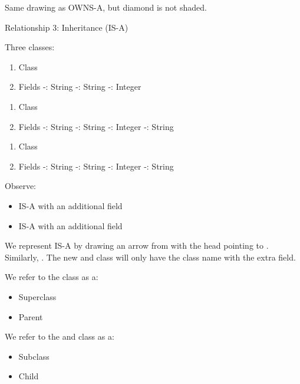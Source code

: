 Same drawing as OWNS-A, but diamond is not shaded.

Relationship 3: Inheritance (IS-A)

Three classes:
\begin{enumerate}[(1)]
    \item Class
          \subitem {}
    \item Fields
          \subitem -: String
          \subitem -: String
          \subitem -: Integer
\end{enumerate}

\begin{enumerate}[(1)]
    \item Class
          \subitem {}
    \item Fields
          \subitem -: String
          \subitem -: String
          \subitem -: Integer
          \subitem -: String
\end{enumerate}

\begin{enumerate}[(1)]
    \item Class
          \subitem {}
    \item Fields
          \subitem -: String
          \subitem -: String
          \subitem -: Integer
          \subitem -: String
\end{enumerate}

Observe:
\begin{itemize}
    \item {} IS-A  with an additional  field
    \item {} IS-A  with an additional  field
\end{itemize}

We represent  IS-A  by drawing an arrow from 
with the head pointing to . Similarly, .
The new  and  class will only have the class name
with the extra field.

We refer to the  class as a:
\begin{itemize}
    \item Superclass
    \item Parent
\end{itemize}

We refer to the  and  class as a:
\begin{itemize}
    \item Subclass
    \item Child
\end{itemize}

